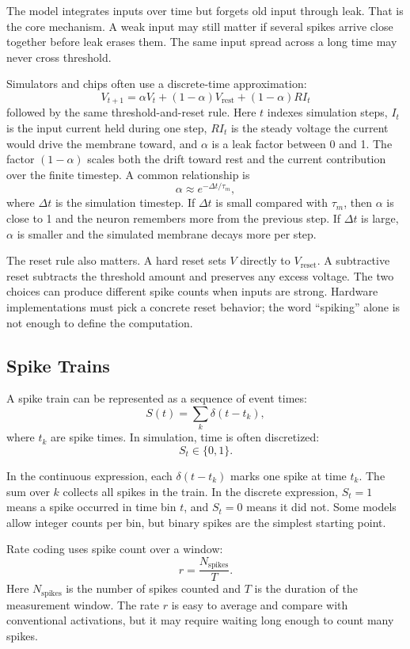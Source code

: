 The model integrates inputs over time but forgets old input through leak. That is the core mechanism. A weak input may still matter if several spikes arrive close together before leak erases them. The same input spread across a long time may never cross threshold.

Simulators and chips often use a discrete-time approximation:
\[
  V_{t+1}
  =
  \alpha V_t + (1-\alpha)V_{\text{rest}} + (1-\alpha) R I_t
\]
followed by the same threshold-and-reset rule. Here \(t\) indexes simulation steps, \(I_t\) is the input current held during one step, \(R I_t\) is the steady voltage the current would drive the membrane toward, and \(\alpha\) is a leak factor between 0 and 1. The factor \((1-\alpha)\) scales both the drift toward rest and the current contribution over the finite timestep. A common relationship is
\[
  \alpha \approx e^{-\Delta t / \tau_m},
\]
where \(\Delta t\) is the simulation timestep. If \(\Delta t\) is small compared with \(\tau_m\), then \(\alpha\) is close to 1 and the neuron remembers more from the previous step. If \(\Delta t\) is large, \(\alpha\) is smaller and the simulated membrane decays more per step.

The reset rule also matters. A hard reset sets \(V\) directly to \(V_{\text{reset}}\). A subtractive reset subtracts the threshold amount and preserves any excess voltage. The two choices can produce different spike counts when inputs are strong. Hardware implementations must pick a concrete reset behavior; the word ``spiking'' alone is not enough to define the computation.

\subsection{Spike Trains}

A spike train can be represented as a sequence of event times:
\[
  S(t) = \sum_k \delta(t - t_k),
\]
where \(t_k\) are spike times. In simulation, time is often discretized:
\[
  S_t \in \{0,1\}.
\]

In the continuous expression, each \(\delta(t - t_k)\) marks one spike at time \(t_k\). The sum over \(k\) collects all spikes in the train. In the discrete expression, \(S_t = 1\) means a spike occurred in time bin \(t\), and \(S_t = 0\) means it did not. Some models allow integer counts per bin, but binary spikes are the simplest starting point.

Rate coding uses spike count over a window:
\[
  r = \frac{N_{\text{spikes}}}{T}.
\]
Here \(N_{\text{spikes}}\) is the number of spikes counted and \(T\) is the duration of the measurement window. The rate \(r\) is easy to average and compare with conventional activations, but it may require waiting long enough to count many spikes.

